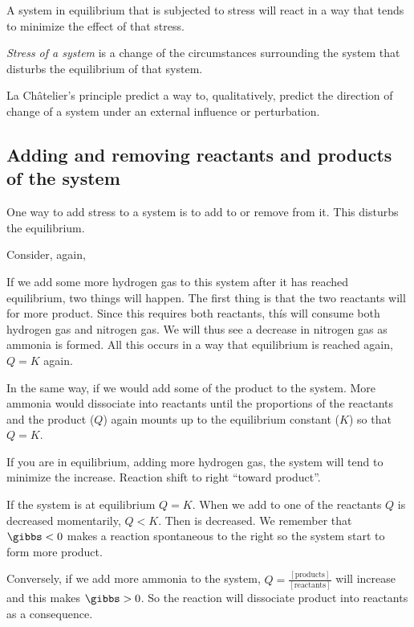\documentclass[../mit-general-chemistry.tex]{subfiles}
\begin{document}
\begin{definition}
  A system in equilibrium that is subjected to stress will react in a
  way that tends to minimize the effect of that stress.
\end{definition}

{\em Stress of a system} is a change of the circumstances surrounding
the system that disturbs the equilibrium of that system.

La Châtelier's principle predict a way to, qualitatively, predict the
direction of change of a system under an external influence or
perturbation.






\subsection{Adding and removing reactants and products of the system}


One way to add stress to a system is to add to or remove from it. This
disturbs the equilibrium.

Consider, again,

If we add some more hydrogen gas to this system after it has reached
equilibrium, two things will happen. The first thing is that the two
reactants will for more product. Since this requires both reactants,
thís will consume both hydrogen gas and nitrogen gas. We will thus see
a decrease in nitrogen gas as ammonia is formed. All this occurs in a
way that equilibrium is reached again, $Q = K$ again.

In the same way, if we would add some of the product to the
system. More ammonia would dissociate into reactants until the
proportions of the reactants and the product ($Q$) again mounts up to
the equilibrium constant ($K$) so that $Q = K$.

If you are in equilibrium, adding more hydrogen gas, the system will
tend to minimize the increase. Reaction shift to right ``toward
product''.

If the system is at equilibrium $Q = K$. When we add to one of the
reactants $Q$ is decreased momentarily, $Q < K$. Then \gibbs is
decreased. We remember that $\gibbs < 0$ makes a reaction spontaneous
to the right so the system start to form more product.

Conversely, if we add more ammonia to the system, $Q =
\frac{[\text{products}]}{[\text{reactants}]}$ will increase and this
makes $\gibbs > 0$. So the reaction will dissociate product into
reactants as a consequence.
\end{document}
